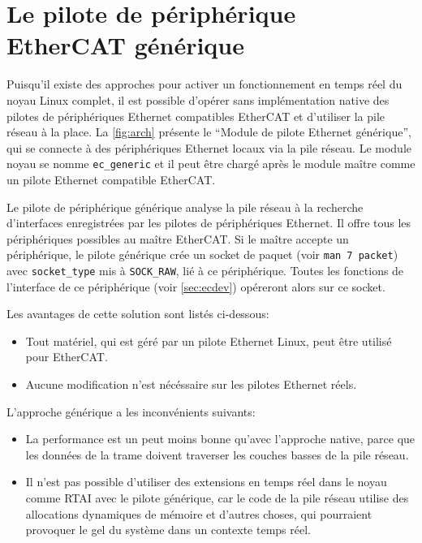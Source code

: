 \documentclass[a4paper,12pt,BCOR6mm,bibtotoc,idxtotoc]{scrbook}
\begin{document}

\section{Le pilote de p\'eriph\'erique EtherCAT g\'en\'erique}
\label{sec:generic-driver}

Puisqu'il existe des approches pour activer un fonctionnement en temps
r\'eel \cite{rt-preempt} du noyau Linux complet, il est possible
d'op\'erer sans impl\'ementation native des pilotes de
p\'eriph\'eriques Ethernet compatibles EtherCAT et d'utiliser la pile
r\'eseau \`a la place. La \autoref{fig:arch} pr\'esente le ``Module de
pilote Ethernet g\'en\'erique'', qui se connecte \`a des
p\'eriph\'eriques Ethernet locaux via la pile r\'eseau.  Le module
noyau se nomme \lstinline+ec_generic+ et il peut \^etre charg\'e
apr\`es le module ma\^itre comme un pilote Ethernet compatible
EtherCAT.

Le pilote de p\'eriph\'erique g\'en\'erique analyse la pile r\'eseau
\`a la recherche d'interfaces enregistr\'ees par les pilotes de
p\'eriph\'eriques Ethernet.  Il offre tous les p\'eriph\'eriques
possibles au ma\^itre EtherCAT. Si le ma\^itre accepte un
p\'eriph\'erique, le pilote g\'en\'erique cr\'ee un socket de paquet
(voir \lstinline+man 7 packet+) avec \lstinline+socket_type+ mis \`a
\lstinline+SOCK_RAW+, li\'e \`a ce p\'eriph\'erique.  Toutes les
fonctions de l'interface de ce p\'eriph\'erique (voir
\autoref{sec:ecdev}) op\'ereront alors sur ce socket.

Les avantages de cette solution sont list\'es ci-dessous:

\begin{itemize}
\item Tout mat\'eriel, qui est g\'er\'e par un pilote Ethernet
  Linux, peut \^etre utilis\'e pour EtherCAT.
\item Aucune modification n'est n\'ec\'essaire sur les pilotes Ethernet
  r\'eels.
\end{itemize}

L'approche g\'en\'erique a les inconv\'enients suivants:

\begin{itemize}
\item La performance est un peut moins bonne qu'avec l'approche
  native, parce que les donn\'ees de la trame doivent traverser les
  couches basses de la pile r\'eseau.
\item Il n'est pas possible d'utiliser des extensions en temps r\'eel
  dans le noyau comme RTAI avec le pilote g\'en\'erique, car le code
  de la pile r\'eseau utilise des allocations dynamiques de m\'emoire
  et d'autres choses, qui pourraient provoquer le gel du syst\`eme
  dans un contexte temps r\'eel.
\end{itemize}
\end{document}
